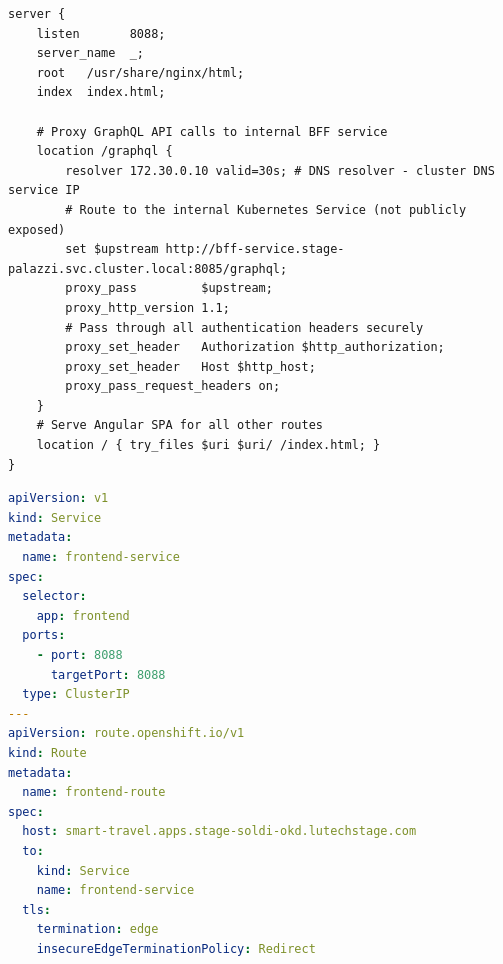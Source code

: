 \begin{lstlisting}[language=Nginx, caption={Nginx Reverse Proxy Configuration for the Hidden BFF}, label={lst:nginx_proxy}]
server {
    listen       8088;
    server_name  _;
    root   /usr/share/nginx/html;
    index  index.html;

    # Proxy GraphQL API calls to internal BFF service
    location /graphql {
        resolver 172.30.0.10 valid=30s; # DNS resolver - cluster DNS service IP
        # Route to the internal Kubernetes Service (not publicly exposed)
        set $upstream http://bff-service.stage-palazzi.svc.cluster.local:8085/graphql;
        proxy_pass         $upstream;
        proxy_http_version 1.1;
        # Pass through all authentication headers securely
        proxy_set_header   Authorization $http_authorization;
        proxy_set_header   Host $http_host;
        proxy_pass_request_headers on;
    }
    # Serve Angular SPA for all other routes
    location / { try_files $uri $uri/ /index.html; }
}
\end{lstlisting}

\begin{lstlisting}[language=YAML, caption={Frontend Service and Public Route Definition}, label={lst:yaml_frontend_route}]
apiVersion: v1
kind: Service
metadata:
  name: frontend-service
spec:
  selector:
    app: frontend
  ports:
    - port: 8088
      targetPort: 8088
  type: ClusterIP
---
apiVersion: route.openshift.io/v1
kind: Route
metadata:
  name: frontend-route
spec:
  host: smart-travel.apps.stage-soldi-okd.lutechstage.com
  to:
    kind: Service
    name: frontend-service
  tls:
    termination: edge
    insecureEdgeTerminationPolicy: Redirect
\end{lstlisting}
